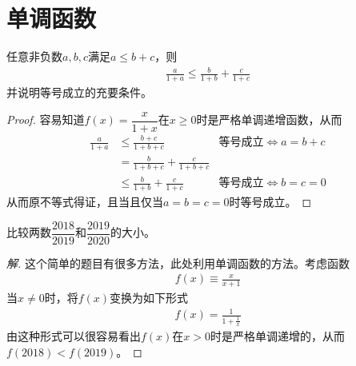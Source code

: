 
\chapter{单调函数}
\label{chap:monotonic-functions}

\begin{example}
  任意非负数$a,b,c$满足$a\le b+c$，则
  \begin{align*}
    \frac{a}{1+a}\le \frac{b}{1+b} + \frac{c}{1+c}
  \end{align*}
  并说明等号成立的充要条件。
\end{example}
\begin{proof}
  容易知道$f(x)=\dfrac{x}{1+x}$在$x\ge0$时是严格单调递增函数，从而
  \begin{align*}
    \frac{a}{1+a}&\le\frac{b+c}{1+b+c}&\text{等号成立}\iff a=b+c\\
    &=\frac{b}{1+b+c} + \frac{c}{1+b+c}\\
    &\le\frac{b}{1+b} + \frac{c}{1+c}&\text{等号成立}\iff b=c=0
  \end{align*}
  从而原不等式得证，且当且仅当$a=b=c=0$时等号成立。
\end{proof}

\begin{example}
  比较两数$\dfrac{2018}{2019}$和$\dfrac{2019}{2020}$的大小。
\end{example}
\begin{proof}[解]
  这个简单的题目有很多方法，此处利用单调函数的方法。考虑函数
  \begin{align*}
    f(x)\equiv \frac{x}{x+1}
  \end{align*}
  当$x\ne0$时，将$f(x)$变换为如下形式
  \begin{align*}
    f(x) = \frac1{1+\frac1x}
  \end{align*}
  由这种形式可以很容易看出$f(x)$在$x>0$时是严格单调递增的，从而$f(2018)<f(2019)$。
\end{proof}


